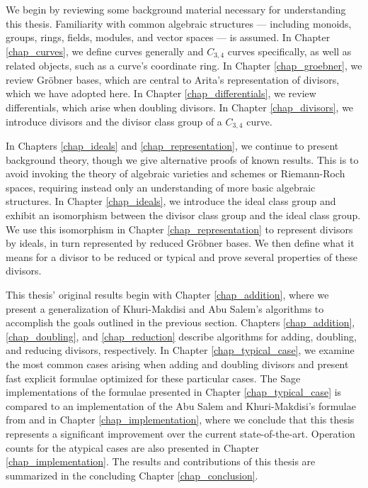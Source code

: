 We begin by reviewing some background material necessary for understanding this thesis.
Familiarity with common algebraic structures ---
including monoids, groups, rings, fields, modules, and vector spaces --- is assumed.
In Chapter \ref{chap_curves}, we define curves generally and $C_{3,4}$ curves specifically,
as well as related objects, such as a curve's coordinate ring.
In Chapter \ref{chap_groebner}, we review Gr\"obner bases,
which are central to Arita's representation of divisors, which we have adopted here.
In Chapter \ref{chap_differentials}, we review differentials, which arise when doubling divisors.
In Chapter \ref{chap_divisors}, we introduce divisors and the divisor class group of a $C_{3,4}$ curve.

In Chapters \ref{chap_ideals} and \ref{chap_representation},
we continue to present background theory, though we give alternative proofs of known results.
This is to avoid invoking the theory of algebraic varieties and schemes or Riemann-Roch spaces,
requiring instead only an understanding of more basic algebraic structures.
In Chapter \ref{chap_ideals}, we introduce the ideal class group and exhibit an isomorphism between the divisor class group and the ideal class group.
We use this isomorphism in Chapter \ref{chap_representation} to represent divisors by ideals,
in turn represented by reduced Gr\"obner bases.
We then define what it means for a divisor to be reduced or typical
and prove several properties of these divisors.

This thesis' original results begin with Chapter \ref{chap_addition},
where we present a generalization of Khuri-Makdisi and Abu Salem's algorithms \cite{salem07,kmakdisi18} to accomplish the goals outlined in the previous section.
Chapters \ref{chap_addition}, \ref{chap_doubling}, and \ref{chap_reduction}
describe algorithms for adding, doubling, and reducing divisors, respectively.
In Chapter \ref{chap_typical_case}, we examine the most common cases arising when
adding and doubling divisors and present fast explicit formulae optimized for these particular cases.
The Sage implementations of the formulae presented in Chapter \ref{chap_typical_case}
is compared to an implementation of the Abu Salem and Khuri-Makdisi's formulae from \cite{salem07} and \cite{kmakdisi18} in Chapter \ref{chap_implementation},
where we conclude that this thesis represents a significant improvement over the current state-of-the-art.
Operation counts for the atypical cases are also presented in Chapter \ref{chap_implementation}.
The results and contributions of this thesis are summarized in the concluding Chapter \ref{chap_conclusion}.

